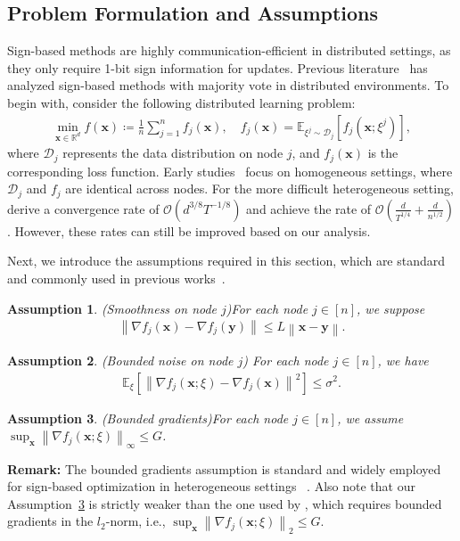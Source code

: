 \documentclass{article}
\newcommand{\E}{\mathbb{E}}
\newcommand{\R}{\mathbb{R}}
\newtheorem{ass}{Assumption}
\newcommand{\Norm}[1]{\left\|#1\right\|}
\def \E {\mathbb{E}}
\def \R {\mathbb{R}}
\def \x {\mathbf{x}}
\def \y {\mathbf{y}}
\def \y {\mathbf{y}}
\def \E {\mathbb{E}}
\def \x {\mathbf{x}}
\def \R {\mathbb{R}}
\begin{document}
\subsection{Problem Formulation and Assumptions}
Sign-based methods are highly communication-efficient in distributed settings, as they only require 1-bit sign information for updates. Previous literature~\citep{pmlr-v80-bernstein18a, bernstein2018signsgd, Jin2020StochasticSignSF, pmlr-v202-sun23l} has analyzed sign-based methods with majority vote in distributed environments. To begin with, consider the following distributed learning problem:
\begin{align}\label{problem3}
    \min_{\x \in \R^d} f(\x) \coloneqq \frac{1}{n}\sum_{j=1}^{n} f_j(\x), \quad f_j(\x)=\E_{\xi^j \sim \mathcal{D}_j} \left[f_j(\x;\xi^j)\right],
\end{align}
where $\mathcal{D}_j$ represents the data distribution on node $j$, and $f_j(\x)$ is the corresponding loss function.
Early studies~\citep{pmlr-v80-bernstein18a, bernstein2018signsgd} focus on homogeneous settings, where $\mathcal{D}_j$ and $f_j$ are identical across nodes. 
For the more difficult heterogeneous setting, \cite{Jin2020StochasticSignSF} derive a convergence rate of $\mathcal{O}\left( d^{3/8} T^{-1/8} \right)$ and \cite{pmlr-v202-sun23l} achieve the rate of $\mathcal{O}\left( \frac{d}{T^{1/4}} + \frac{d}{n^{1/2}} \right)$. However, these rates can still be improved based on our analysis.

Next, we introduce the assumptions required in this section, which are standard and commonly used in previous works~\citep{Jin2020StochasticSignSF, pmlr-v202-sun23l}. 
\begin{ass}(Smoothness on node $j$)\label{smooth-j} For each node $j\in[n]$, we suppose
    \begin{align*}
        \Norm{\nabla f_j(\x)-\nabla f_j(\y)}\le L\Norm{\x-\y}.
    \end{align*}
\end{ass}
\begin{ass}\label{ass:3++}  (Bounded noise on node $j$) For each node $j\in[n]$, we have
\begin{equation*}
\begin{split}
 \mathbb{E}_{\xi}\left[\left\|\nabla f_j(\x;\xi) -\nabla f_j(\mathbf{x})\right\|^{2}\right] \leq \sigma^{2}.
\end{split}
\end{equation*} 
\end{ass}
\begin{ass}(Bounded gradients)\label{bg1}
    For each node $j\in[n]$, we assume $\sup_{\x} \Norm{\nabla f_j(\x;\xi)}_\infty\le G$.
\end{ass}
\textbf{Remark:} The bounded gradients assumption is standard and widely employed for sign-based optimization in heterogeneous settings ~\citep{Jin2020StochasticSignSF, pmlr-v202-sun23l,Tang_Wang_Chang_2024}. Also note that our Assumption~\ref{bg1} is strictly weaker than the one used by \citet{pmlr-v202-sun23l}, which requires bounded gradients in the $l_2$-norm, i.e., $\sup_{\x} \Norm{\nabla f_j(\x;\xi)}_2 \le G$.
\end{document}
